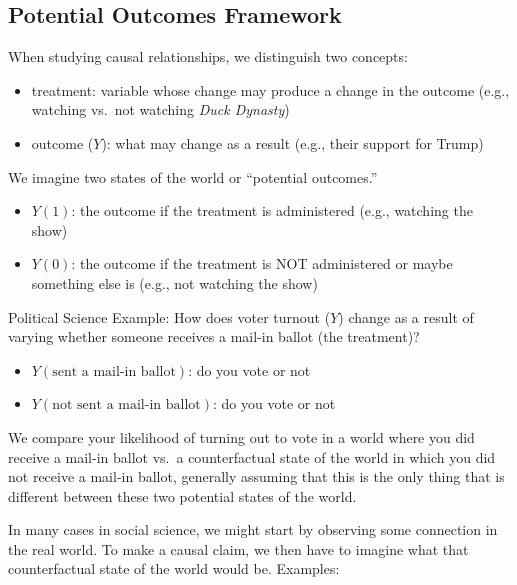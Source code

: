 \documentclass[
  letterpaper,
  DIV=11,
  numbers=noendperiod]{scrreprt}
\providecommand{\tightlist}{%
  \setlength{\itemsep}{0pt}\setlength{\parskip}{0pt}}\usepackage{longtable,booktabs,array}
\begin{document}
\hypertarget{potential-outcomes-framework}{%
\subsection{Potential Outcomes
Framework}\label{potential-outcomes-framework}}

When studying causal relationships, we distinguish two concepts:

\begin{itemize}
\tightlist
\item
  treatment: variable whose change may produce a change in the outcome
  (e.g., watching vs.~not watching \emph{Duck Dynasty})
\item
  outcome (\(Y\)): what may change as a result (e.g., their support for
  Trump)
\end{itemize}

We imagine two states of the world or ``potential outcomes.''

\begin{itemize}
\tightlist
\item
  \(Y(1)\): the outcome if the treatment is administered (e.g., watching
  the show)
\item
  \(Y(0)\): the outcome if the treatment is NOT administered or maybe
  something else is (e.g., not watching the show)
\end{itemize}

Political Science Example: How does voter turnout (\(Y\)) change as a
result of varying whether someone receives a mail-in ballot (the
treatment)?

\begin{itemize}
\tightlist
\item
  \(Y(\text{sent a mail-in ballot})\): do you vote or not
\item
  \(Y(\text{not sent a mail-in ballot})\): do you vote or not
\end{itemize}

We compare your likelihood of turning out to vote in a world where you
did receive a mail-in ballot vs.~a counterfactual state of the world in
which you did not receive a mail-in ballot, generally assuming that this
is the only thing that is different between these two potential states
of the world.

In many cases in social science, we might start by observing some
connection in the real world. To make a causal claim, we then have to
imagine what that counterfactual state of the world would be. Examples:
\end{document}
